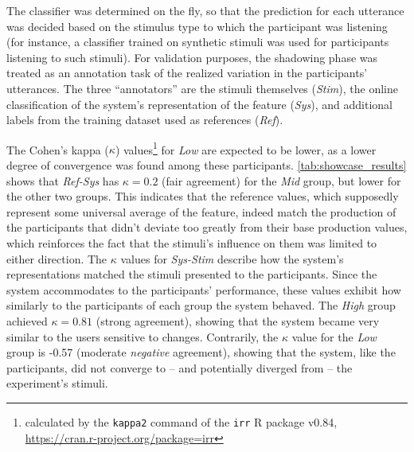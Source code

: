 The classifier was determined on the fly, so that the prediction for each utterance was decided based on the stimulus type to which the participant was listening (for instance, a classifier trained on synthetic stimuli was used for participants listening to such stimuli).
For validation purposes, the shadowing phase was treated as an annotation task of the realized variation in the participants' utterances.
The three \enquote{annotators} are the stimuli themselves (\emph{Stim}), the online classification of the system's representation of the feature (\emph{Sys}), and additional labels from the training dataset used as references (\emph{Ref}).

The Cohen's kappa ($\kappa$) values\footnote{calculated by the \texttt{kappa2} command of the \texttt{irr} R package v0.84, \url{https://cran.r-project.org/package=irr}} for \emph{Low} are expected to be lower, as a lower degree of convergence was found among these participants.
\cref{tab:showcase_results} shows that \emph{Ref-Sys} has $\kappa = 0.2$ (fair agreement) for the \emph{Mid} group, but lower for the other two groups.
This indicates that the reference values, which supposedly represent some universal average of the feature, indeed match the production of the participants that didn't deviate too greatly from their base production values, which reinforces the fact that the stimuli's influence on them was limited to either direction.
The $\kappa$ values for \emph{Sys-Stim} describe how the system's representations matched the stimuli presented to the participants.
Since the system accommodates to the participants' performance, these values exhibit how similarly to the participants of each group the system behaved.
The \emph{High} group achieved $\kappa = 0.81$ (strong agreement), showing that the system became very similar to the users sensitive to changes.
Contrarily, the $\kappa$ value for the \emph{Low} group is -0.57 (moderate \emph{negative} agreement), showing that the system, like the participants, did not converge to -- and potentially diverged from -- the experiment's stimuli.
%
